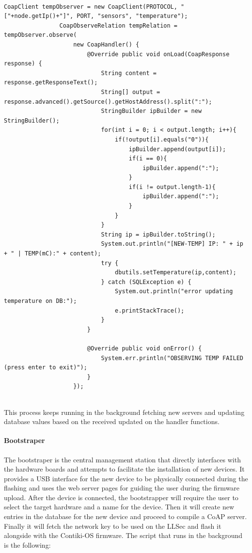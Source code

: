 \begin{lstlisting}[caption={CoAP Client Resource Handling}]

CoapClient tempObserver = new CoapClient(PROTOCOL, "["+node.getIp()+"]", PORT, "sensors", "temperature");
				CoapObserveRelation tempRelation = tempObserver.observe(
					new CoapHandler() {
						@Override public void onLoad(CoapResponse response) {
							String content = response.getResponseText();
							String[] output = response.advanced().getSource().getHostAddress().split(":");
							StringBuilder ipBuilder = new StringBuilder();
							for(int i = 0; i < output.length; i++){
								if(!output[i].equals("0")){
									ipBuilder.append(output[i]);
									if(i == 0){
										ipBuilder.append(":");
									}
									if(i != output.length-1){
										ipBuilder.append(":");
									}
								}
							}
							String ip = ipBuilder.toString();
							System.out.println("[NEW-TEMP] IP: " + ip + " | TEMP(mC):" + content);
							try {
								dbutils.setTemperature(ip,content);
							} catch (SQLException e) {
								System.out.println("error updating temperature on DB:");
								e.printStackTrace();
							}
						}
						
						@Override public void onError() {
							System.err.println("OBSERVING TEMP FAILED (press enter to exit)");
						}
					});


\end{lstlisting}

This process keeps running in the background fetching new servers and updating database values based on the received updated on the handler functions.

\paragraph{\textbf{Bootstraper}}
\paragraph{}

The bootstraper is the central management station that directly interfaces with the hardware boards and attempts to facilitate the installation of new devices. It provides a USB interface for the new device to be physically connected during the flashing and uses the web server pages for guiding the user during the firmware upload. After the device is connected, the bootstrapper will require the user to select the target hardware and a name for the device. Then it will create new entries in the database for the new device and proceed to compile a \gls{CoAP} server. Finally it will fetch the network key to be used on the \gls{LLSec} and flash it alongside with the Contiki-OS firmware. The script that runs in the background is the following:

